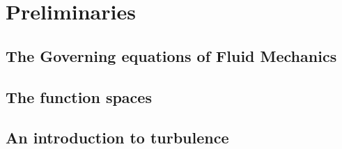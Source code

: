 
\chapter{Preliminaries}
\label{chap-Preliminaries}


\newcommand{\keyword}[1]{\textbf{#1}}
\newcommand{\tabhead}[1]{\textbf{#1}}
\newcommand{\code}[1]{\texttt{#1}}
\newcommand{\file}[1]{\texttt{\bfseries#1}}
\newcommand{\option}[1]{\texttt{\itshape#1}}


\section{The Governing equations of Fluid Mechanics}


\section{The function spaces}


\section{An introduction to turbulence}

